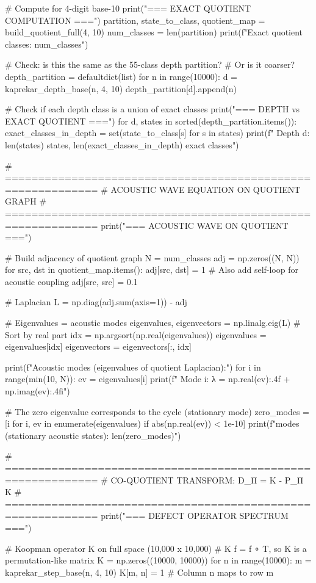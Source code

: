 # Compute for 4-digit base-10
print("=== EXACT QUOTIENT COMPUTATION ===")
partition, state_to_class, quotient_map = build_quotient_full(4, 10)
num_classes = len(partition)
print(f"Exact quotient classes: {num_classes}")

# Check: is this the same as the 55-class depth partition?
# Or is it coarser?
depth_partition = defaultdict(list)
for n in range(10000):
    d = kaprekar_depth_base(n, 4, 10)
    depth_partition[d].append(n)

# Check if each depth class is a union of exact classes
print("\n=== DEPTH vs EXACT QUOTIENT ===")
for d, states in sorted(depth_partition.items()):
    exact_classes_in_depth = set(state_to_class[s] for s in states)
    print(f"  Depth {d}: {len(states)} states, {len(exact_classes_in_depth)} exact classes")

# ============================================================
# ACOUSTIC WAVE EQUATION ON QUOTIENT GRAPH
# ============================================================
print("\n=== ACOUSTIC WAVE ON QUOTIENT ===")

# Build adjacency of quotient graph
N = num_classes
adj = np.zeros((N, N))
for src, dst in quotient_map.items():
    adj[src, dst] = 1
    # Also add self-loop for acoustic coupling
    adj[src, src] = 0.1

# Laplacian
L = np.diag(adj.sum(axis=1)) - adj

# Eigenvalues = acoustic modes
eigenvalues, eigenvectors = np.linalg.eig(L)
# Sort by real part
idx = np.argsort(np.real(eigenvalues))
eigenvalues = eigenvalues[idx]
eigenvectors = eigenvectors[:, idx]

print(f"Acoustic modes (eigenvalues of quotient Laplacian):")
for i in range(min(10, N)):
    ev = eigenvalues[i]
    print(f"  Mode {i}: λ = {np.real(ev):.4f} + {np.imag(ev):.4f}i")

# The zero eigenvalue corresponds to the cycle (stationary mode)
zero_modes = [i for i, ev in enumerate(eigenvalues) if abs(np.real(ev)) < 1e-10]
print(f"\nZero modes (stationary acoustic states): {len(zero_modes)}")

# ============================================================
# CO-QUOTIENT TRANSFORM: D_Π = K - P_Π K
# ============================================================
print("\n=== DEFECT OPERATOR SPECTRUM ===")

# Koopman operator K on full space (10,000 x 10,000)
# K f = f ∘ T, so K is a permutation-like matrix
K = np.zeros((10000, 10000))
for n in range(10000):
    m = kaprekar_step_base(n, 4, 10)
    K[m, n] = 1  # Column n maps to row m

